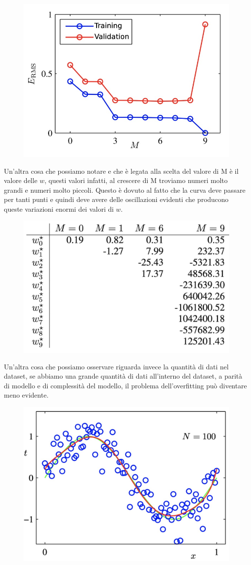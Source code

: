 \documentclass[14pt]{extreport}
\begin{document}
\begin{figure}[H]
\centering
\includegraphics[width=0.5\linewidth]{84.jpeg}
\end{figure}

Un'altra cosa che possiamo notare e che è legata alla scelta del valore di M è il valore delle $w$, questi valori infatti, al crescere di M troviamo
numeri molto grandi e numeri molto piccoli. Questo è dovuto al fatto che la curva deve passare per tanti punti e quindi deve avere delle oscillazioni
evidenti che producono queste variazioni enormi dei valori di $w$.

\begin{figure}[H]
\centering
\includegraphics[width=0.4\linewidth]{85.jpeg}
\end{figure}

Un'altra cosa che possiamo osservare riguarda invece la quantità di dati nel dataset, se abbiamo una grande quantità di dati all'interno del dataset,
a parità di modello e di complessità del modello, il problema dell'overfitting può diventare meno evidente.


\begin{figure}[H]
\centering
\includegraphics[width=0.4\linewidth]{86.jpeg}
\end{figure}
\end{document}
